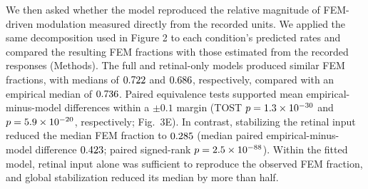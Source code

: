 \documentclass{lite}
\begin{document}

We then asked whether the model reproduced the relative magnitude of FEM-driven modulation measured directly from the recorded units. We applied the same decomposition used in Figure 2 to each condition's predicted rates and compared the resulting FEM fractions with those estimated from the recorded responses (Methods). The full and retinal-only models produced similar FEM fractions, with medians of $0.722$ and $0.686$, respectively, compared with an empirical median of $0.736$. Paired equivalence tests supported mean empirical-minus-model differences within a $\pm0.1$ margin (TOST $p = 1.3\times10^{-30}$ and $p = 5.9\times10^{-20}$, respectively; Fig.~3E). In contrast, stabilizing the retinal input reduced the median FEM fraction to $0.285$ (median paired empirical-minus-model difference $0.423$; paired signed-rank $p = 2.5\times10^{-88}$). Within the fitted model, retinal input alone was sufficient to reproduce the observed FEM fraction, and global stabilization reduced its median by more than half.
\end{document}
